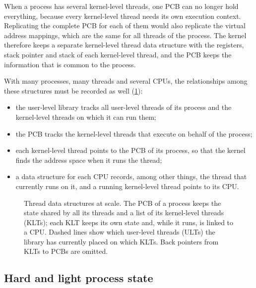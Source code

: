 \documentclass[../main.tex]{subfiles}
\begin{document}
When a process has several kernel-level threads, one PCB can no longer
hold everything, because every kernel-level thread needs its own execution
context.  Replicating the complete PCB for each of them would also
replicate the virtual address mappings, which are the same for all threads
of the process.  The kernel therefore keeps a separate kernel-level thread
data structure with the registers, stack pointer and stack of each
kernel-level thread, and the PCB keeps the information that is common to
the process.

With many processes, many threads and several CPUs, the relationships
among these structures must be recorded as well
(\cref{fig:l05-structures}):
\begin{itemize}
  \item the user-level library tracks all user-level threads of its process
    and the kernel-level threads on which it can run them;
  \item the PCB tracks the kernel-level threads that execute on behalf of
    the process;
  \item each kernel-level thread points to the PCB of its process, so that
    the kernel finds the address space when it runs the thread;
  \item a data structure for each CPU records, among other things, the
    thread that currently runs on it, and a running kernel-level thread
    points to its CPU.
\end{itemize}

\begin{figure}[htbp]
  \centering
  
  \caption{Thread data structures at scale.  The PCB of a process keeps the
    state shared by all its threads and a list of its kernel-level threads
    (KLTs); each KLT keeps its own state and, while it runs, is linked to a
    CPU.  Dashed lines show which user-level threads (ULTs) the library has
    currently placed on which KLTs.  Back pointers from KLTs to PCBs are
    omitted.}
  \label{fig:l05-structures}
\end{figure}

\subsection{Hard and light process state}
\end{document}
